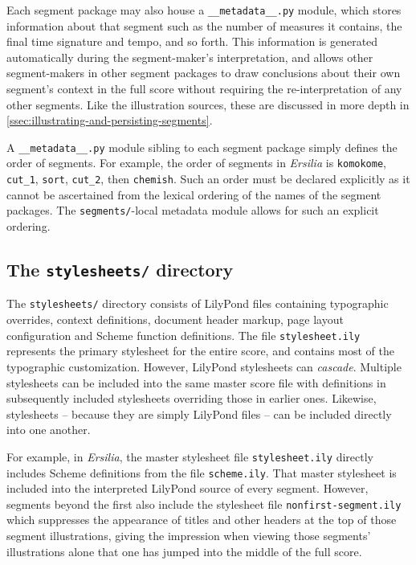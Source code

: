 Each segment package may also house a \texttt{\_\_metadata\_\_.py}
module, which stores information about that segment such as the number of
measures it contains, the final time signature and tempo, and so forth. This
information is generated automatically during the segment-maker's
interpretation, and allows other segment-makers in other segment packages to
draw conclusions about their own segment's context in the full score without
requiring the re-interpretation of any other segments. Like the illustration
sources, these are discussed in more depth in
\autoref{ssec:illustrating-and-persisting-segments}.

A \texttt{\_\_metadata\_\_.py} module sibling to each segment package simply
defines the order of segments. For example, the order of segments in
\emph{Ersilia} is \texttt{komokome}, \texttt{cut\_1}, \texttt{sort},
\texttt{cut\_2}, then \texttt{chemish}. Such an order must be declared
explicitly as it cannot be ascertained from the lexical ordering of the names
of the segment packages. The \texttt{segments/}-local metadata module allows
for such an explicit ordering.

\subsection{The \texttt{stylesheets/} directory}
\label{ssec:the-stylesheets-directory}

The \texttt{stylesheets/} directory consists of LilyPond files containing
typographic overrides, context definitions, document header markup, page layout
configuration and Scheme function definitions. The file \texttt{stylesheet.ily}
represents the primary stylesheet for the entire score, and contains most of
the typographic customization. However, LilyPond stylesheets can
\emph{cascade}. Multiple stylesheets can be included into the same master score
file with definitions in subsequently included stylesheets overriding those in
earlier ones. Likewise, stylesheets -- because they are simply LilyPond files --
can be included directly into one another.

For example, in \emph{Ersilia}, the master stylesheet file
\texttt{stylesheet.ily} directly includes Scheme definitions from the
file \texttt{scheme.ily}. That master stylesheet is included into the
interpreted LilyPond source of every segment. However, segments beyond the
first also include the stylesheet file \texttt{nonfirst-segment.ily} which
suppresses the appearance of titles and other headers at the top of those
segment illustrations, giving the impression when viewing those segments'
illustrations alone that one has jumped into the middle of the full score.


